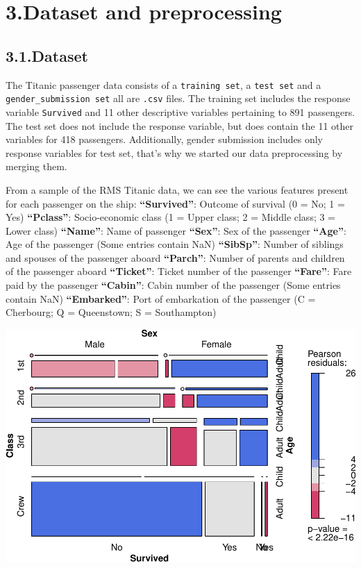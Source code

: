 \documentclass[
]{article}
\begin{document}
\hypertarget{dataset-and-preprocessing}{%
\section{3.Dataset and preprocessing}\label{dataset-and-preprocessing}}

\hypertarget{dataset}{%
\subsection{3.1.Dataset}\label{dataset}}

The Titanic passenger data consists of a \texttt{training\ set}, a
\texttt{test\ set} and a \texttt{gender\_submission\ set} all are
\texttt{.csv} files. The training set includes the response variable
\texttt{Survived} and 11 other descriptive variables pertaining to 891
passengers. The test set does not include the response variable, but
does contain the 11 other variables for 418 passengers. Additionally,
gender submission includes only response variables for test set, that's
why we started our data preprocessing by merging them.

From a sample of the RMS Titanic data, we can see the various features
present for each passenger on the ship: \textbf{``Survived''}: Outcome
of survival (0 = No; 1 = Yes) \textbf{``Pclass''}: Socio-economic class
(1 = Upper class; 2 = Middle class; 3 = Lower class) \textbf{``Name''}:
Name of passenger \textbf{``Sex''}: Sex of the passenger
\textbf{``Age''}: Age of the passenger (Some entries contain NaN)
\textbf{``SibSp''}: Number of siblings and spouses of the passenger
aboard \textbf{``Parch''}: Number of parents and children of the
passenger aboard \textbf{``Ticket''}: Ticket number of the passenger
\textbf{``Fare''}: Fare paid by the passenger \textbf{``Cabin''}: Cabin
number of the passenger (Some entries contain NaN)
\textbf{``Embarked''}: Port of embarkation of the passenger (C =
Cherbourg; Q = Queenstown; S = Southampton)

\includegraphics{AEProject_files/figure-latex/unnamed-chunk-1-1.pdf}
\end{document}
